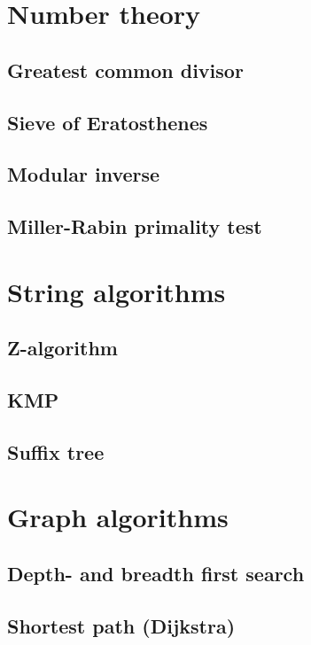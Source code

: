 \documentclass[a4paper,10pt]{article}
\begin{document}
\pagestyle{fancy}
\chead{}
\rhead{\thepage}
\lfoot{}
\cfoot{}
\rfoot{}


\tableofcontents
\newpage
\section{Number theory}
\subsection{Greatest common divisor}

\subsection{Sieve of Eratosthenes}

\subsection{Modular inverse}

\subsection{Miller-Rabin primality test}
\section{String algorithms}
\subsection{Z-algorithm}
\subsection{KMP}

\subsection{Suffix tree}
\section{Graph algorithms}
\subsection{Depth- and breadth first search}

\subsection{Shortest path (Dijkstra)}

\end{document}

